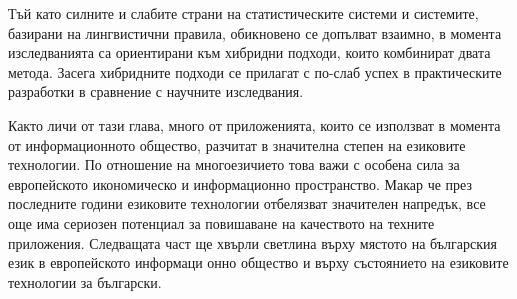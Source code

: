 \documentclass[]{../../metanetpaper}
\begin{document}
\begin{multicols}{2}
Тъй като силните и слабите страни на статистическите системи и системите, базирани на лингвистични правила, обикновено се допълват взаимно, в момента изследванията са ориентирани към хибридни подходи, които комбинират  двата метода. Засега хибридните подходи се прилагат с по-слаб успех в практическите разработки в сравнение с научните изследвания. 

Както личи от тази глава, много от приложенията, които се използват в момента от информационното общество, разчитат в значителна степен на езиковите технологии. По отношение на многоезичието това важи с особена сила за европейското икономическо и информационно пространство. Макар че през последните години езиковите технологии отбелязват значителен напредък, все още има сериозен потенциал за повишаване на  качеството на техните приложения. Следващата част ще хвърли светлина върху мястото на българския език в европейското информаци
 онно общество и върху състоянието на езиковите технологии за български.  
\end{multicols}

\clearpage

\end{document}
